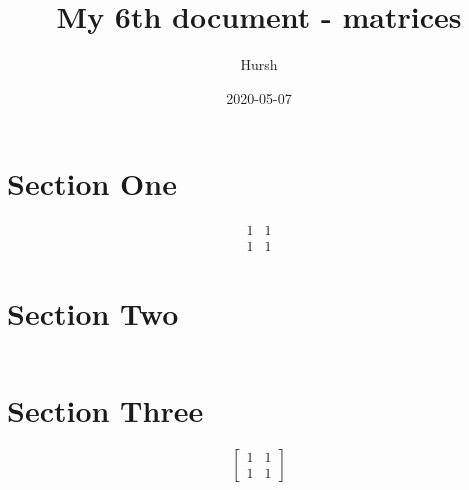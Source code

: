 \documentclass{article}
\title{My 6th document - matrices}
\date{2020-05-07}
\author{Hursh}
\begin{document}
\maketitle
{}
\newpage
{}
\section{Section One}
\begin{equation}
\begin{matrix}
1 & 1\\
1 & 1
\end{matrix}
\end{equation}
\section{Section Two}
\begin{equation*}
[
\begin{matrix}
1 & 1\\
1 & 1
\end{matrix}
]
\end{equation*}
\section{Section Three}
\begin{equation}
\left[
\begin{matrix}
1 & 1\\
1 & 1
\end{matrix}
\right]
\end{equation}
\end{document}
